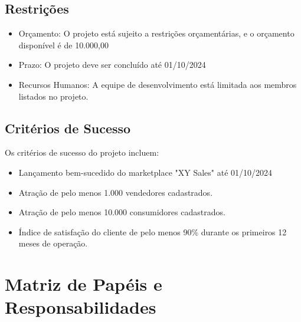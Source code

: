\documentclass[
	12pt,				%
	openright,			%
	twoside,			%
	a4paper,			%
	english,			%
	brazil				%
	]{abntex2}
\begin{document}
\section{Restrições}
\begin{itemize}
    \item Orçamento: O projeto está sujeito a restrições orçamentárias, e o orçamento disponível é de 10.000,00
    \item Prazo: O projeto deve ser concluído até 01/10/2024
    \item Recursos Humanos: A equipe de desenvolvimento está limitada aos membros listados no projeto.
\end{itemize}

\section{Critérios de Sucesso}
Os critérios de sucesso do projeto incluem:
\begin{itemize}
    \item Lançamento bem-sucedido do marketplace "XY Sales" até 01/10/2024
    \item Atração de pelo menos 1.000 vendedores cadastrados.
    \item Atração de pelo menos 10.000 consumidores cadastrados.
    \item Índice de satisfação do cliente de pelo menos 90\% durante os primeiros 12 meses de operação.
\end{itemize}


\chapter{Matriz de Papéis e Responsabilidades}\label{cap_matriz_de_papeis_e_responsabilidades}
\end{document}

